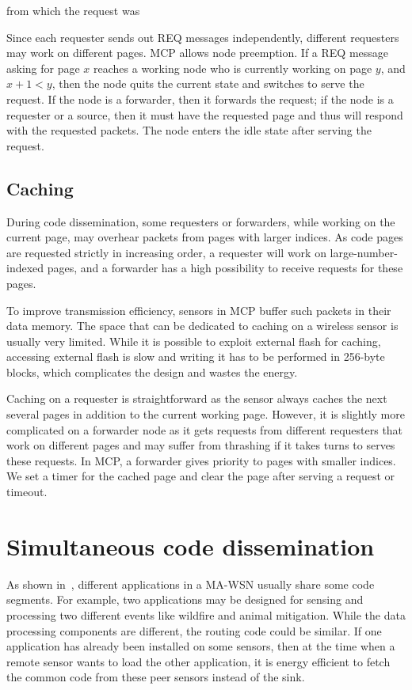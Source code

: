 from which the request was %

Since each requester sends out REQ messages independently, different requesters may work on different pages. MCP allows 
node preemption. If a REQ message asking for page $x$ reaches a working node who is currently working on page $y$, and 
$x+1 < y$, then the node quits the current state and switches to serve the request. If the node is a forwarder, then it 
forwards the request; if the node is a requester or a source, then it must have the requested page and thus will 
respond with the requested packets. The node enters the idle state after serving the request.

\subsection{Caching}
During code dissemination, some requesters or forwarders, while working on the current page, may overhear packets from 
pages with larger indices. As code pages are requested strictly in increasing order, a requester will work on 
large-number-indexed pages, and a forwarder has a high possibility to receive requests for these pages. 

To improve transmission efficiency, sensors in MCP buffer such packets in their data memory. The space that can be 
dedicated to caching on a wireless sensor is usually very limited. While it is possible to exploit external flash for 
caching, accessing external flash is slow and writing it has to be performed in 256-byte blocks, which complicates the 
design and wastes the energy. 

Caching on a requester is straightforward as the sensor always caches the next several pages in addition to the current 
working page. However, it is slightly more complicated on a forwarder node as it gets requests from different 
requesters that work on different pages and may suffer from thrashing if it takes turns to serves these requests. In 
MCP, a forwarder gives priority to pages with smaller indices. We set a timer for the cached page and clear the page 
after serving a request or timeout.


\section{Simultaneous code dissemination}
As shown in~\cite{melete}, different applications in a MA-WSN
usually share some code segments. For example, two applications
may be designed for sensing and processing two different
events like wildfire and animal mitigation. While the
data processing components are different, the routing code
could be similar. If one application has already been installed
on some sensors, then at the time when a remote sensor
wants to load the other application, it is energy efficient
to fetch the common code from these peer sensors instead of
the sink. 

